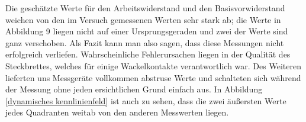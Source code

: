Die geschätzte Werte für den Arbeitswiderstand und den Basisvorwiderstand weichen von den im Versuch gemessenen Werten sehr stark ab; die Werte in Abbildung 9 liegen nicht auf einer Ursprungsgeraden und zwei der Werte sind ganz verschoben. Als Fazit kann man also sagen, dass diese Messungen nicht erfolgreich verliefen. Wahrscheinliche Fehlerursachen liegen in der Qualität des Steckbrettes, welches für einige Wackelkontakte verantwortlich war. Des Weiteren lieferten uns Messgeräte vollkommen abstruse Werte und schalteten sich während der Messung ohne jeden ersichtlichen Grund einfach aus. In Abbildung \ref{dynamisches kennlinienfeld} ist auch zu sehen, dass die zwei äußersten Werte jedes Quadranten weitab von den anderen Messwerten liegen.\\


